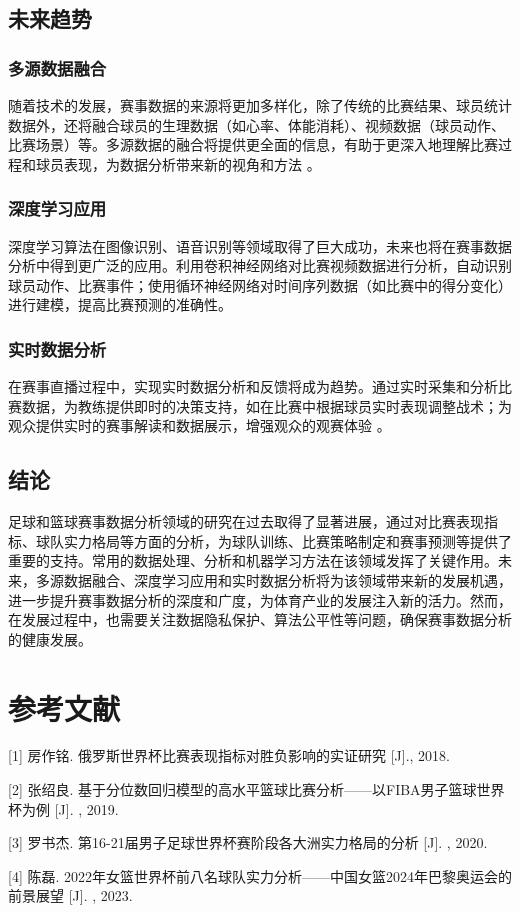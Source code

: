 \documentclass[UTF8]{ctexart}
\begin{document}
\subsection{未来趋势}\label{ux4e94ux672aux6765ux8d8bux52bf}

\subsubsection{多源数据融合}\label{ux4e00uxff09ux591aux6e90ux6570ux636eux878dux5408}

随着技术的发展，赛事数据的来源将更加多样化，除了传统的比赛结果、球员统计数据外，还将融合球员的生理数据（如心率、体能消耗）、视频数据（球员动作、比赛场景）等。多源数据的融合将提供更全面的信息，有助于更深入地理解比赛过程和球员表现，为数据分析带来新的视角和方法
。

\subsubsection{深度学习应用}\label{ux4e8cuxff09ux6df1ux5ea6ux5b66ux4e60ux5e94ux7528}

深度学习算法在图像识别、语音识别等领域取得了巨大成功，未来也将在赛事数据分析中得到更广泛的应用。利用卷积神经网络对比赛视频数据进行分析，自动识别球员动作、比赛事件；使用循环神经网络对时间序列数据（如比赛中的得分变化）进行建模，提高比赛预测的准确性。

\subsubsection{实时数据分析}\label{ux4e09uxff09ux5b9eux65f6ux6570ux636eux5206ux6790}

在赛事直播过程中，实现实时数据分析和反馈将成为趋势。通过实时采集和分析比赛数据，为教练提供即时的决策支持，如在比赛中根据球员实时表现调整战术；为观众提供实时的赛事解读和数据展示，增强观众的观赛体验
。

\subsection{结论}\label{ux516dux7ed3ux8bba}

足球和篮球赛事数据分析领域的研究在过去取得了显著进展，通过对比赛表现指标、球队实力格局等方面的分析，为球队训练、比赛策略制定和赛事预测等提供了重要的支持。常用的数据处理、分析和机器学习方法在该领域发挥了关键作用。未来，多源数据融合、深度学习应用和实时数据分析将为该领域带来新的发展机遇，进一步提升赛事数据分析的深度和广度，为体育产业的发展注入新的活力。然而，在发展过程中，也需要关注数据隐私保护、算法公平性等问题，确保赛事数据分析的健康发展。

\section*{参考文献}

[1] 房作铭. 俄罗斯世界杯比赛表现指标对胜负影响的实证研究 [J]., 2018.

[2] 张绍良. 基于分位数回归模型的高水平篮球比赛分析——以FIBA男子篮球世界杯为例 [J]. , 2019.

[3] 罗书杰. 第16-21届男子足球世界杯赛阶段各大洲实力格局的分析 [J]. , 2020.

[4] 陈磊. 2022年女篮世界杯前八名球队实力分析——中国女篮2024年巴黎奥运会的前景展望 [J]. , 2023.
\end{document}
